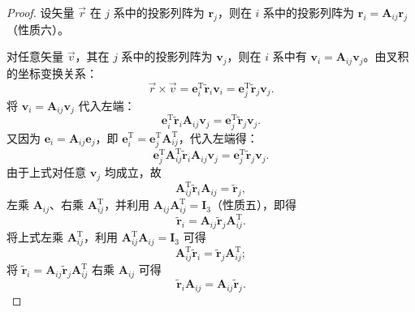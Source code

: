 \begin{proof}
	设矢量 $\vec{r}$ 在 $j$ 系中的投影列阵为 $\boldsymbol{r}_j$，则在 $i$ 系中的投影列阵为 $\boldsymbol{r}_i=\boldsymbol{A}_{ij}\boldsymbol{r}_j$（性质六）。
	
	对任意矢量 $\vec{v}$，其在 $j$ 系中的投影列阵为 $\boldsymbol{v}_j$，则在 $i$ 系中有 $\boldsymbol{v}_i=\boldsymbol{A}_{ij}\boldsymbol{v}_j$。由叉积的坐标变换关系：
	$$
	\vec{r}\times\vec{v}=\boldsymbol{e}_i^{\mathrm{T}}\tilde{\boldsymbol{r}}_i\boldsymbol{v}_i=\boldsymbol{e}_j^{\mathrm{T}}\tilde{\boldsymbol{r}}_j\boldsymbol{v}_j.
	$$
	将 $\boldsymbol{v}_i=\boldsymbol{A}_{ij}\boldsymbol{v}_j$ 代入左端：
	$$
	\boldsymbol{e}_i^{\mathrm{T}}\tilde{\boldsymbol{r}}_i\boldsymbol{A}_{ij}\boldsymbol{v}_j=\boldsymbol{e}_j^{\mathrm{T}}\tilde{\boldsymbol{r}}_j\boldsymbol{v}_j.
	$$
	又因为 $\boldsymbol{e}_i=\boldsymbol{A}_{ij}\boldsymbol{e}_j$，即 $\boldsymbol{e}_i^{\mathrm{T}}=\boldsymbol{e}_j^{\mathrm{T}}\boldsymbol{A}_{ij}^{\mathrm{T}}$，代入左端得：
	$$
	\boldsymbol{e}_j^{\mathrm{T}}\boldsymbol{A}_{ij}^{\mathrm{T}}\tilde{\boldsymbol{r}}_i\boldsymbol{A}_{ij}\boldsymbol{v}_j=\boldsymbol{e}_j^{\mathrm{T}}\tilde{\boldsymbol{r}}_j\boldsymbol{v}_j.
	$$
	由于上式对任意 $\boldsymbol{v}_j$ 均成立，故
	$$
	\boldsymbol{A}_{ij}^{\mathrm{T}}\tilde{\boldsymbol{r}}_i\boldsymbol{A}_{ij}=\tilde{\boldsymbol{r}}_j,
	$$
	左乘 $\boldsymbol{A}_{ij}$、右乘 $\boldsymbol{A}_{ij}^{\mathrm{T}}$，并利用 $\boldsymbol{A}_{ij}\boldsymbol{A}_{ij}^{\mathrm{T}}=\boldsymbol{I}_3$（性质五），即得
	$$
	\tilde{\boldsymbol{r}}_i=\boldsymbol{A}_{ij}\tilde{\boldsymbol{r}}_j\boldsymbol{A}_{ij}^{\mathrm{T}}.
	$$
	将上式左乘 $\boldsymbol{A}_{ij}^{\mathrm{T}}$，利用 $\boldsymbol{A}_{ij}^{\mathrm{T}}\boldsymbol{A}_{ij}=\boldsymbol{I}_3$ 可得
	$$
	\boldsymbol{A}_{ij}^{\mathrm{T}}\tilde{\boldsymbol{r}}_i=\tilde{\boldsymbol{r}}_j\boldsymbol{A}_{ij}^{\mathrm{T}};
	$$
	将 $\tilde{\boldsymbol{r}}_i=\boldsymbol{A}_{ij}\tilde{\boldsymbol{r}}_j\boldsymbol{A}_{ij}^{\mathrm{T}}$ 右乘 $\boldsymbol{A}_{ij}$ 可得
	$$
	\tilde{\boldsymbol{r}}_i\boldsymbol{A}_{ij}=\boldsymbol{A}_{ij}\tilde{\boldsymbol{r}}_j.
	$$
\end{proof}

